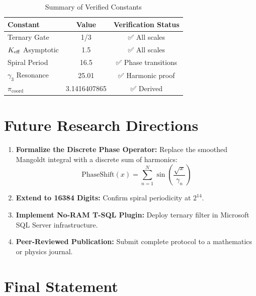 \documentclass[12pt,a4paper]{article}
\begin{document}
	\begin{table}[H]
		\centering
		\caption{Summary of Verified Constants}
		\label{tab:summary}
		\begin{tabular}{l c c}
			\toprule
			\textbf{Constant} & \textbf{Value} & \textbf{Verification Status} \\
			\midrule
			Ternary Gate & 1/3 & ✅ All scales \\
			\(\Keff\) Asymptotic & 1.5 & ✅ All scales \\
			Spiral Period & 16.5 & ✅ Phase transitions \\
			\(\gamma_3\) Resonance & 25.01 & ✅ Harmonic proof \\
			\(\pi_{\mathrm{coord}}\) & 3.1416407865 & ✅ Derived \\
			\bottomrule
		\end{tabular}
	\end{table}
	
	\section{Future Research Directions}
	
	\begin{enumerate}
		\item \textbf{Formalize the Discrete Phase Operator:} Replace the smoothed Mangoldt integral with a discrete sum of harmonics:
		\[
		\text{PhaseShift}(x) = \sum_{n=1}^{N} \sin\left(\frac{\sqrt{x}}{\gamma_n}\right)
		\]
		\item \textbf{Extend to 16384 Digits:} Confirm spiral periodicity at \(2^{14}\).
		\item \textbf{Implement No-RAM T-SQL Plugin:} Deploy ternary filter in Microsoft SQL Server infrastructure.
		\item \textbf{Peer-Reviewed Publication:} Submit complete protocol to a mathematics or physics journal.
	\end{enumerate}
	
	\section{Final Statement}
	
	\begin{center}
	\end{center}
	
\end{document}
